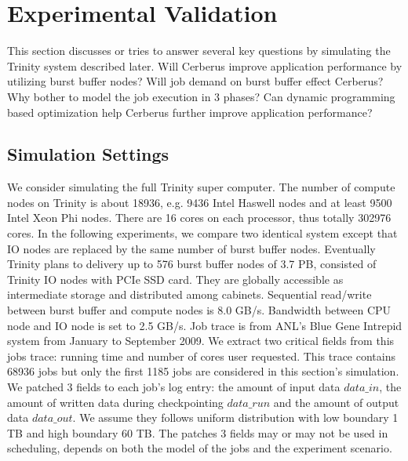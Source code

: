 \section{Experimental Validation}
\label{Sec:Experiments}

This section discusses or tries to answer several key questions by
simulating the Trinity system described later.
Will Cerberus improve application performance by utilizing burst buffer nodes?
Will job demand on burst buffer effect Cerberus?
Why bother to model the job execution in 3 phases?
Can dynamic programming based optimization help Cerberus further
improve application performance?

\subsection{Simulation Settings}
We consider simulating the full Trinity super computer\cite{TrinitySystem}.
The number of compute nodes on Trinity is about 18936,
e.g. 9436 Intel Haswell nodes
and at least 9500 Intel Xeon Phi nodes.
There are 16 cores on each processor, thus totally 302976 cores.
In the following experiments, we compare two identical system except that
IO nodes are replaced by the same number of burst buffer nodes.
Eventually Trinity plans to delivery up to 576 burst buffer nodes of 3.7 PB,
consisted of Trinity IO nodes with PCIe SSD card.
They are globally accessible as intermediate storage and distributed among cabinets.
Sequential read/write between burst buffer and compute nodes is 8.0 GB/s.
Bandwidth between CPU node and IO node is set to 2.5 GB/s.
Job trace is from ANL's Blue Gene Intrepid system
from January to September 2009\cite{JobTrace}.
We extract two critical fields from this jobs trace: running time and
number of cores user requested.
This trace contains 68936 jobs but
only the first 1185 jobs are considered in this section's simulation.
We patched 3 fields to each job's log entry: the amount of input data $data\_in$,
the amount of written data during checkpointing $data\_run$
and the amount of output data $data\_out$.
We assume they follows uniform distribution with
low boundary 1 TB and high boundary 60 TB.
The patches 3 fields may or may not be used in scheduling,
depends on both the model of the jobs and the experiment scenario.


